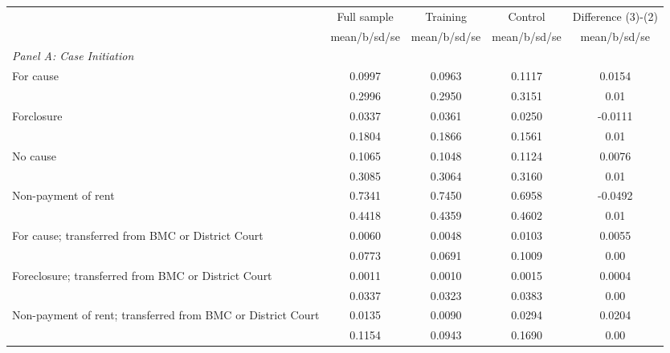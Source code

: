 {
\def\sym#1{\ifmmode^{#1}\else\(^{#1}\)\fi}
\begin{tabular}{l*{4}{c}}
\toprule
                    &\multicolumn{1}{c}{Full sample}&\multicolumn{1}{c}{Training}&\multicolumn{1}{c}{Control}&\multicolumn{1}{c}{Difference (3)-(2)}\\
                    &mean/b/sd/se&mean/b/sd/se&mean/b/sd/se&mean/b/sd/se\\
\midrule
\emph{Panel A: Case Initiation}&            &            &            &            \\
\hspace{0.25cm}For cause&     0.0997 &     0.0963 &     0.1117 &      0.0154\\
                    &     0.2996 &     0.2950 &     0.3151 &        0.01\\
\hspace{0.25cm}Forclosure&     0.0337 &     0.0361 &     0.0250 &     -0.0111\\
                    &     0.1804 &     0.1866 &     0.1561 &        0.01\\
\hspace{0.25cm}No cause&     0.1065 &     0.1048 &     0.1124 &      0.0076\\
                    &     0.3085 &     0.3064 &     0.3160 &        0.01\\
\hspace{0.25cm}Non-payment of rent&     0.7341 &     0.7450 &     0.6958 &     -0.0492\\
                    &     0.4418 &     0.4359 &     0.4602 &        0.01\\
\hspace{0.25cm}For cause; transferred from BMC or District Court&     0.0060 &     0.0048 &     0.0103 &      0.0055\\
                    &     0.0773 &     0.0691 &     0.1009 &        0.00\\
\hspace{0.25cm}Foreclosure; transferred from BMC or District Court&     0.0011 &     0.0010 &     0.0015 &      0.0004\\
                    &     0.0337 &     0.0323 &     0.0383 &        0.00\\
\hspace{0.25cm}Non-payment of rent; transferred from BMC or District Court&     0.0135 &     0.0090 &     0.0294 &      0.0204\\
                    &     0.1154 &     0.0943 &     0.1690 &        0.00\\

\end{tabular}}
